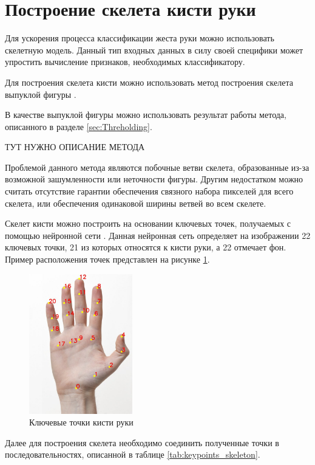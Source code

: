 \section{Построение скелета кисти руки}
\label{sec:Skeleton}

Для ускорения процесса классификации жеста руки можно использовать скелетную модель. Данный тип входных данных в силу своей специфики может упростить вычисление признаков, необходимых классификатору.

Для построения скелета кисти можно использовать метод построения скелета выпуклой фигуры \cite{DIP}. 

В качестве выпуклой фигуры можно использовать результат работы метода, описанного в разделе \ref{sec:Threholding}.

ТУТ НУЖНО ОПИСАНИЕ МЕТОДА

Проблемой данного метода являются побочные ветви скелета, образованные из-за возможной зашумленности или неточности фигуры. Другим недостатком можно считать отсутствие гарантии обеспечения связного набора пикселей для всего скелета, или обеспечения одинаковой ширины ветвей во всем скелете.

Скелет кисти можно построить на основании ключевых точек, получаемых с помощью нейронной сети \cite{DNN}. Данная нейронная сеть определяет на изображении 22 ключевых точки, 21 из которых относятся к кисти руки, а 22 отмечает фон. Пример расположения точек представлен на рисунке \ref{fig:keypoints}.

\begin{figure}[!h]
	\centering
	\includegraphics[width=0.4\textwidth,keepaspectratio]{figures/ru/handpose-demo-keypoints}
	\caption{Ключевые точки кисти руки}
	\label{fig:keypoints}
\end{figure}

Далее для построения скелета необходимо соединить полученные точки в последовательностях, описанной в таблице \ref{tab:keypoints_skeleton}.

